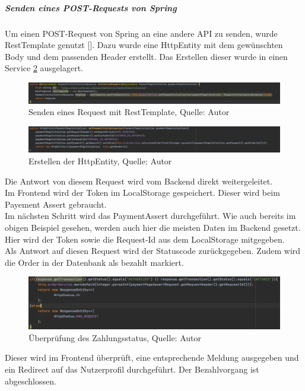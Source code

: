 \subparagraph{Senden eines POST-Requests von Spring}\label{postSpring}
Um einen POST-Request von Spring an eine andere API zu senden, wurde \ac{RestTemplate} genutzt [\cite{restTemplate}]. Dazu wurde eine HttpEntity mit dem gewünschten Body und dem passenden Header erstellt. Das Erstellen dieser wurde in einen Service \ref{img: httpEntity} ausgelagert. 
\begin{figure}[H]
	\includegraphics[width=1\textwidth]{images/restTemplate.PNG}
	\caption[Senden eines Request mit RestTemplate]{Senden eines Request mit RestTemplate, Quelle: Autor}
	\label{img: restTemplate}
\end{figure}
\begin{figure}[H]
	\includegraphics[width=1\textwidth]{images/httpEntity.PNG}
	\caption[Erstellen der HttpEntity]{Erstellen der HttpEntity, Quelle: Autor}
	\label{img: httpEntity}
\end{figure}

Die Antwort von diesem Request wird vom Backend direkt weitergeleitet. \\Im Frontend wird der Token im \gls{LocalStorage} gespeichert. Dieser wird beim Payement Assert gebraucht.
\\
Im nächsten Schritt wird das PaymentAssert durchgeführt. Wie auch bereits im obigen Beispiel gesehen, werden auch hier die meisten Daten im Backend gesetzt. Hier wird der Token sowie die Request-Id aus dem \gls{LocalStorage} mitgegeben. \\
Als Antwort auf diesen Request wird der Statuscode zurückgegeben. Zudem wird die Order in der Datenbank als bezahlt markiert. 
 \begin{figure}[H]
	\centering
	\includegraphics[width=1\textwidth]{images/pageAssertReturn.PNG}
	\caption[Überprüfung des Zahlungsstatus]{Überprüfung des Zahlungsstatus, Quelle: Autor}
	\label{img: pageAssertReturn}
\end{figure} 
Dieser wird im Frontend überprüft, eine entsprechende Meldung ausgegeben und ein Redirect auf das Nutzerprofil durchgeführt. Der Bezahlvorgang ist abgeschlossen.  


